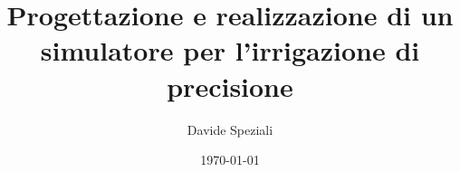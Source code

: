 \documentclass[12pt,a4paper,openright,twoside, openany, draft]{book}
\title{Progettazione e realizzazione di un simulatore per l'irrigazione di precisione}
\author{Davide Speziali}
\date{\today}
\begin{document}
\frontmatter\frontispiece
%

%
\tableofcontents

\mainmatter

\end{document}
